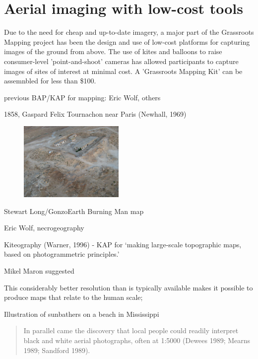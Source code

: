 \documentclass[11pt]{report}
\begin{document}
\section{Aerial imaging with low-cost tools}
\label{sec:aeriallowcost}

Due to the need for cheap and up-to-date imagery, a major part of the Grassroots Mapping project has been the design and use of low-cost platforms for capturing images of the ground from above. The use of kites and balloons to raise consumer-level 'point-and-shoot' cameras has allowed participants to capture images of sites of interest at minimal cost. A 'Grassroots Mapping Kit' can be assemnbled for less than \$100. 

previous BAP/KAP for mapping: Eric Wolf, others

1858, Gaspard Felix Tournachon near Paris (Newhall, 1969) \cite{vierling2006short}

\begin{figure}
	\begin{flushright}
		\includegraphics[width=0.45\textwidth]{images/maron-spy-satellite.jpg}
		\cite{maron2008former}
	\end{flushright}
\end{figure}

Stewart Long/GonzoEarth Burning Man map

Eric Wolf, necrogeography

Kiteography (Warner, 1996) - KAP for `making large-scale topographic maps, based on photogrammetric principles.' \cite{vierling2006short}

Mikel Maron suggested


This considerably better resolution than is typically available makes it possible to produce maps that relate to the human scale; 


Illustration of sunbathers on a beach in Mississippi

\begin{quote}
In parallel came the discovery that local people could readily interpret black and white aerial photographs, often at 1:5000 (Dewees 1989; Mearns 1989; Sandford 1989). 
\cite{chambers2006participatory}
\end{quote}
\end{document}
